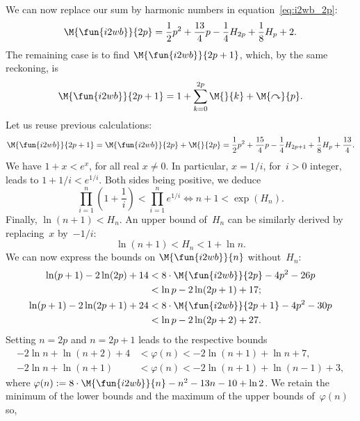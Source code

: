 We can now replace our sum by harmonic numbers in
equation~\eqref{eq:i2wb_2p}:
\begin{equation*}
\M{\fun{i2wb}}{2p}
  = \frac{1}{2}{p^2} + \frac{13}{4}{p} - \frac{1}{4}{H_{2p}}
    + \frac{1}{8}{H_p} + 2.
\end{equation*}
The remaining case is to find \(\M{\fun{i2wb}}{2p+1}\), which, by the
same reckoning, is
\begin{equation*}
\M{\fun{i2wb}}{2p+1}
  = 1 + \sum_{k=0}^{2p}{\M{}{k}} + \M{\curvearrowright}{p}.
\end{equation*}
Let us reuse previous calculations:
\begin{equation*}
\M{\fun{i2wb}}{2p+1}
   = \M{\fun{i2wb}}{2p} + \M{}{2p}
   = \frac{1}{2}{p^2} + \frac{15}{4}{p} - \frac{1}{4}{H_{2p+1}}
     + \frac{1}{8}{H_p} + \frac{13}{4}.
\end{equation*}
We have \(1 + x < e^x\), for all real \(x \neq 0\). In particular,
\(x=1/i\), for~\(i>0\) integer, leads to \(1 + 1/i < e^{1/i}\). Both
sides being positive, we deduce
\begin{equation*}
  \prod_{i=1}^{n}\left(1+\frac{1}{i}\right) <
  \prod_{i=1}^{n}{e^{1/i}} \Leftrightarrow n+1 < \exp(H_n).
\end{equation*}
Finally, \(\ln(n+1) < H_n\). An upper bound of~\(H_n\) can be
similarly derived by replacing~\(x\) by~\(-1/i\):
\begin{equation}
\ln(n+1) < H_n < 1 + \ln n.\label{ineq:Hn}
\end{equation}
We can now express the bounds on
\(\M{\fun{i2wb}}{n}\) without~\(H_n\):
\begin{align*}
\ln(p+1) - 2\ln(2p) + 14
&< 8 \cdot \M{\fun{i2wb}}{2p} - 4{p^2} - 26{p}\\
& < \ln p - 2\ln(2p+1) + 17;\\
\ln(p+1) - 2\ln(2p+1) + 24
&< 8 \cdot \M{\fun{i2wb}}{2p+1} - 4{p^2} - 30{p}\\
&< \ln{p} - 2\ln(2p+2) + 27.
\end{align*}
Setting \(n=2p\) and \(n=2p+1\) leads to the respective bounds
\begin{align*}
-2\ln n + \ln(n+2) + 4 &< \varphi(n) < -2\ln(n+1) + \ln n + 7,\\
-2\ln n + \ln(n+1)     &< \varphi(n) < -2\ln(n+1) + \ln(n-1) + 3,
\end{align*}
where \(\varphi(n) := 8 \cdot \M{\fun{i2wb}}{n} - n^2 - 13n - 10 + \ln
2\). We retain the minimum of the lower bounds and the maximum of the
upper bounds of~\(\varphi(n)\) so,
